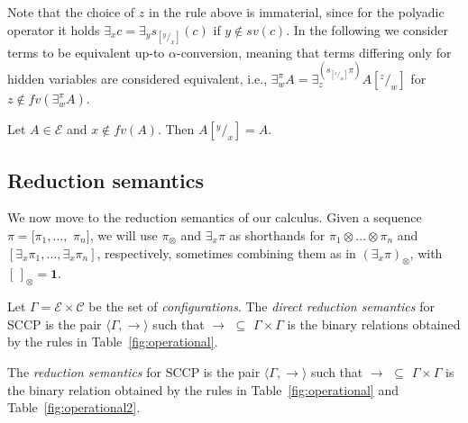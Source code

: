 \documentclass{llncs}
\def\1{{\mathbf 1}}
\def\C{{\mathcal C}}
\def\1{{\mathbf 1}}
\def\C{{\mathcal C}}
\def\odiv{\, {\ominus\hspace{-7.7pt} \div} \,}
\begin{document}
Note that the choice of $z$ in the rule above is immaterial, since for the polyadic operator it holds
$\exists_x c = \exists_y s_{[^y/_x]}(c)$ if $y \not \in sv(c)$.
%
In the following we consider terms to be equivalent up-to $\alpha$-conversion, meaning that terms 
differing only for hidden variables are considered equivalent, i.e.,
$\exists_w^\pi A = \exists_z^{(s_{[^z/_w]}\pi)} A[^z/_w]$ for $z \not \in fv(\exists^{\pi}_w A)$.

\begin{lemma}
Let $A \in \mathcal{E}$ and $x \not \in fv(A)$. Then $A[^y/_x] = A$.
\end{lemma}


\subsection{Reduction semantics}
We now move to the reduction semantics of our calculus. 
%
Given a sequence $\pi = [\pi_1, \ldots,$ $\pi_n]$, we will use 
$\pi_\otimes$ and $\exists_x \pi$
as shorthands for $\pi_1 \otimes \ldots \otimes \pi_n$ and
$[\exists_x \pi_1, \ldots, \exists_x \pi_n]$, respectively,
sometimes combining them as in $(\exists_x \pi)_\otimes$,
with $[\,]_\otimes = \1$.

\begin{definition}[Reductions]\label{def:reductions}
Let $\Gamma = {\mathcal E} \times \C$ be the set of \emph{configurations}.
The \emph{direct reduction semantics} for SCCP is the pair 
$\langle \Gamma,  \to \rangle$
such that $\to \, \, \subseteq \, \,\Gamma \times   \Gamma$ is the 
binary relations obtained by the rules in 
Table~\ref{fig:operational}.

The \emph{reduction semantics} for SCCP is the pair 
$\langle \Gamma,  \rightarrow \rangle$
such that $\rightarrow \, \, \subseteq \, \,\Gamma \times   \Gamma$ is the
binary relation obtained by the rules in 
Table~\ref{fig:operational} and Table~\ref{fig:operational2}.
\end{definition}

\end{document}

